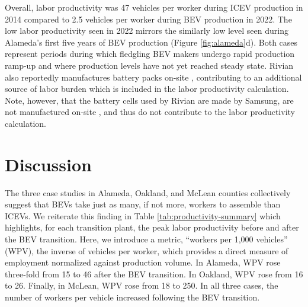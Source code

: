 \documentclass[sn-mathphys,Numbered]{sn-jnl}%
\begin{document}
Overall, labor productivity was 47 vehicles per worker during ICEV production in 2014 compared to 2.5 vehicles per worker during BEV production in 2022. The low labor productivity seen in 2022 mirrors the similarly low level seen during Alameda's first five years of BEV production (Figure \ref{fig:alameda}d). Both cases represent periods during which fledgling BEV makers undergo rapid production ramp-up and where production levels have not yet reached steady state. Rivian also reportedly manufactures battery packs on-site \cite{Weintraub2021-ti}, contributing to an additional source of labor burden which is included in the labor productivity calculation. Note, however, that the battery cells used by Rivian are made by Samsung, are not manufactured on-site \cite{Weintraub2021-ti}, and thus do not contribute to the labor productivity calculation.

\section{Discussion}

The three case studies in Alameda, Oakland, and McLean counties collectively suggest that BEVs take just as many, if not more, workers to assemble than ICEVs. We reiterate this finding in Table \ref{tab:productivity-summary} which highlights, for each transition plant, the peak labor productivity before and after the BEV transition. Here, we introduce a metric, ``workers per 1,000 vehicles'' (WPV), the inverse of vehicles per worker, which provides a direct measure of employment normalized against production volume. In Alameda, WPV rose three-fold from 15 to 46 after the BEV transition. In Oakland, WPV rose from 16 to 26. Finally, in McLean, WPV rose from 18 to 250. In all three cases, the number of workers per vehicle increased following the BEV transition.
\end{document}

